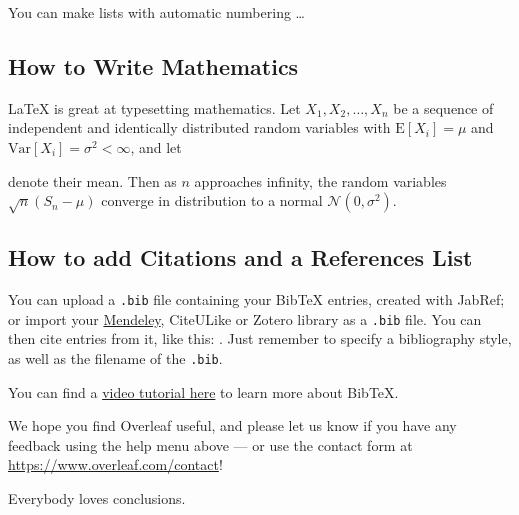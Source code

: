 \documentclass[a4paper]{article}
\begin{document}
You can make lists with automatic numbering \dots


\subsection{How to Write Mathematics}

\LaTeX{} is great at typesetting mathematics. Let $X_1, X_2, \ldots, X_n$ be a sequence of independent and identically distributed random variables with
$\text{E}[X_i] = \mu$ and $\text{Var}[X_i] = \sigma^2 < \infty$, and let

denote their mean. Then as $n$ approaches infinity, the random variables $\sqrt{n}(S_n - \mu)$ converge in distribution to a normal $\mathcal{N}(0, \sigma^2)$.

\subsection{How to add Citations and a References List}

You can upload a \verb|.bib| file containing your BibTeX entries, created with JabRef; or import your \href{https://www.overleaf.com/blog/184}{Mendeley}, CiteULike or Zotero library as a \verb|.bib| file. You can then cite entries from it, like this: . Just remember to specify a bibliography style, as well as the filename of the \verb|.bib|.

You can find a \href{https://www.overleaf.com/help/97-how-to-include-a-bibliography-using-bibtex}{video tutorial here} to learn more about BibTeX.

We hope you find Overleaf useful, and please let us know if you have any feedback using the help menu above --- or use the contact form at \url{https://www.overleaf.com/contact}!


Everybody loves conclusions.


%
%
\end{document}
